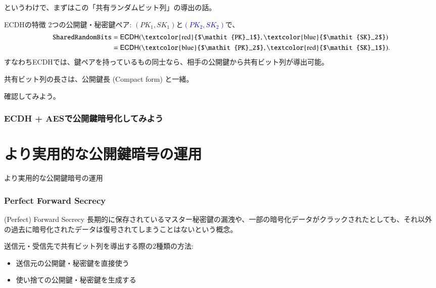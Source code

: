 \documentclass[12pt,dvipdfmx]{beamer}
\begin{document}
\begin{frame}
というわけで、まずはこの「共有ランダムビット列」の導出の話。
\begin{block}{\small ECDHの特徴}
2つの公開鍵・秘密鍵ペア: \alert{$(\mathit{PK_1}, \mathit{SK}_1)$}と\textcolor{blue}{$(\mathit{PK_2}, \mathit{SK}_2)$}で、
\begin{align*}
\mathtt{SharedRandomBits} &= \mathsf{ECDH}(
\text{\textcolor{red}{$\mathit{PK}_1$}},
\text{\textcolor{blue}{$\mathit{SK}_2$}}
)\\
& = \mathsf{ECDH}(
\text{\textcolor{blue}{$\mathit{PK}_2$}},
\text{\textcolor{red}{$\mathit{SK}_1$}}
).
\end{align*}
すなわちECDHでは、\alert{鍵ペアを持っているもの同士なら、相手の公開鍵から共有ビット列が導出可能}。
\end{block}

共有ビット列の長さは、公開鍵長 (Compact form) と一緒。
\end{frame}

\begin{frame}
確認してみよう。
\end{frame}

\begin{frame}
\frametitle{ECDH + AESで公開鍵暗号化してみよう}
\end{frame}


\section{より実用的な公開鍵暗号の運用}
\begin{frame}
\centering
{\Large より実用的な公開鍵暗号の運用}
\end{frame}

\begin{frame}
\frametitle{Perfect Forward Secrecy}

\begin{block}{\small (Perfect) Forward Secrecy}
長期的に保存されているマスター秘密鍵の漏洩や、一部の暗号化データがクラックされたとしても、\alert{それ以外の過去に暗号化されたデータは復号されてしまうことはない}という概念。
\end{block}

\end{frame}

\begin{frame}
送信元・受信先で共有ビット列を導出する際の2種類の方法:
\begin{itemize}
 \item 送信元の公開鍵・秘密鍵を直接使う
 \item 使い捨ての公開鍵・秘密鍵を生成する
\end{itemize}
\end{frame}
\end{document}
